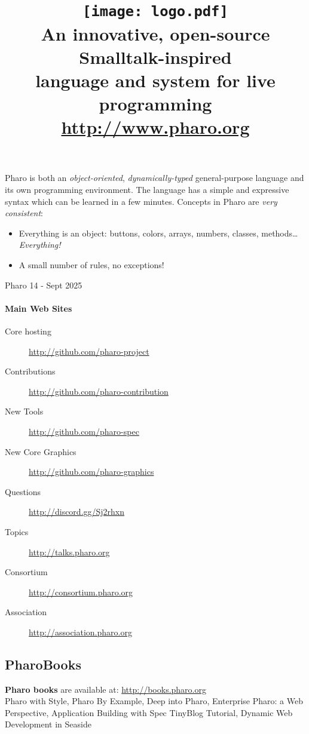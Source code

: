 \documentclass[notumble]{leaflet}
\title{\vspace{-1.0cm}\normalfont
\texttt{[image: logo.pdf]}
\\[1.2\baselineskip]%
\vspace{-0.8cm}
\fontseries{cl}\selectfont\LARGE
An innovative, open-source Smalltalk-inspired \\ language and system for live programming\\
\url{http://www.pharo.org}}
\date{}
\begin{document}
\maketitle
\thispagestyle{empty}
\vspace{-1.7cm}
Pharo is both an \emph{object-oriented}, \emph{dynamically-typed}
general-purpose language and its own programming environment. The
language has a simple and expressive syntax which can be learned
in a few minutes. Concepts in Pharo are \emph{very consistent}:
\begin{itemize}
  \item Everything is an object: buttons, colors, arrays, numbers, classes, methods\ldots \emph{Everything!}
  \item A small number of rules, no exceptions!
\end{itemize}
\begin{tiny}Pharo 14 - Sept 2025\end{tiny}
\vspace{-0.2cm}
\paragraph{Main Web Sites}
\begin{description}
 \item[Core hosting] \url{http://github.com/pharo-project}
 \item[Contributions] \url{http://github.com/pharo-contribution}
 \item[New Tools] \url{http://github.com/pharo-spec}
 \item[New Core Graphics] \url{http://github.com/pharo-graphics}
 \item[Questions]    \url{http://discord.gg/Sj2rhxn}
 \item[Topics]       \url{http://talks.pharo.org}
 \item[Consortium]   \url{http://consortium.pharo.org}
 \item[Association]  \url{http://association.pharo.org}
\end{description}

\vspace{-0.3cm}
\subsection{PharoBooks}

\textbf{Pharo books} are available at: \url{http://books.pharo.org}\\
Pharo with Style, Pharo By Example, Deep into Pharo, Enterprise Pharo: a Web Perspective, Application Building with Spec
TinyBlog Tutorial, Dynamic Web Development in Seaside
\end{document}
